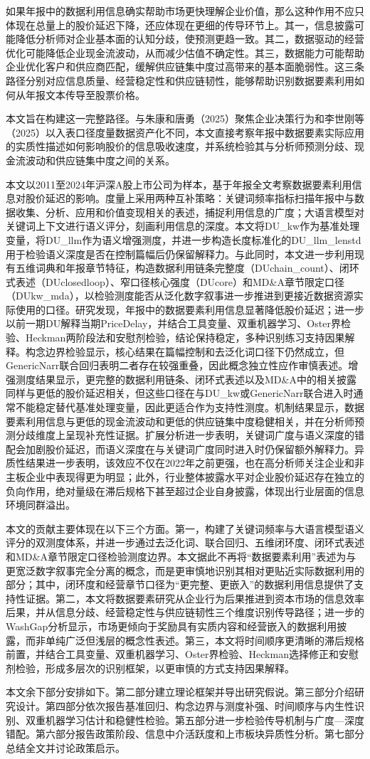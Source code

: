 如果年报中的数据利用信息确实帮助市场更快理解企业价值，那么这种作用不应只体现在总量上的股价延迟下降，还应体现在更细的传导环节上。其一，信息披露可能降低分析师对企业基本面的认知分歧，使预测更趋一致。其二，数据驱动的经营优化可能降低企业现金流波动，从而减少估值不确定性。其三，数据能力可能帮助企业优化客户和供应商匹配，缓解供应链集中度过高带来的基本面脆弱性。这三条路径分别对应信息质量、经营稳定性和供应链韧性，能够帮助识别数据要素利用如何从年报文本传导至股票价格。

本文旨在构建这一完整路径。与朱康和唐勇（2025）聚焦企业决策行为和李世刚等（2025）以入表口径度量数据资产化不同，本文直接考察年报中数据要素实际应用的实质性描述如何影响股价的信息吸收速度，并系统检验其与分析师预测分歧、现金流波动和供应链集中度之间的关系。

本文以2011至2024年沪深A股上市公司为样本，基于年报全文考察数据要素利用信息对股价延迟的影响。度量上采用两种互补策略：关键词频率指标扫描年报中与数据收集、分析、应用和价值变现相关的表述，捕捉利用信息的广度；大语言模型对关键词上下文进行语义评分，刻画利用信息的深度。本文将DU\_kw作为基准处理变量，将DU\_llm作为语义增强测度，并进一步构造长度标准化的DU\_llm\_lenstd用于检验语义深度是否在控制篇幅后仍保留解释力。与此同时，本文进一步利用现有五维词典和年报章节特征，构造数据利用链条完整度（DUchain\_count）、闭环式表述（DUclosedloop）、窄口径核心强度（DUcore）和MD\&A章节限定口径（DUkw\_mda），以检验测度能否从泛化数字叙事进一步推进到更接近数据资源实际使用的口径。研究发现，年报中的数据要素利用信息显著降低股价延迟；进一步以前一期DU解释当期PriceDelay，并结合工具变量、双重机器学习、Oster界检验、Heckman两阶段法和安慰剂检验，结论保持稳定，多种识别练习支持因果解释。构念边界检验显示，核心结果在篇幅控制和去泛化词口径下仍然成立，但GenericNarr联合回归表明二者存在较强重叠，因此概念独立性应作审慎表述。增强测度结果显示，更完整的数据利用链条、闭环式表述以及MD\&A中的相关披露同样与更低的股价延迟相关，但这些口径在与DU\_kw或GenericNarr联合进入时通常不能稳定替代基准处理变量，因此更适合作为支持性测度。机制结果显示，数据要素利用信息与更低的现金流波动和更低的供应链集中度稳健相关，并在分析师预测分歧维度上呈现补充性证据。扩展分析进一步表明，关键词广度与语义深度的错配会加剧股价延迟，而语义深度在与关键词广度同时进入时仍保留额外解释力。异质性结果进一步表明，该效应不仅在2022年之前更强，也在高分析师关注企业和非主板企业中表现得更为明显；此外，行业整体披露水平对企业股价延迟存在独立的负向作用，绝对量级在滞后规格下甚至超过企业自身披露，体现出行业层面的信息环境同群溢出。

本文的贡献主要体现在以下三个方面。第一，构建了关键词频率与大语言模型语义评分的双测度体系，并进一步通过去泛化词、联合回归、五维闭环度、闭环式表述和MD\&A章节限定口径检验测度边界。本文据此不再将``数据要素利用''表述为与更宽泛数字叙事完全分离的概念，而是更审慎地识别其相对更贴近实际数据利用的部分；其中，闭环度和经营章节口径为``更完整、更嵌入''的数据利用信息提供了支持性证据。第二，本文将数据要素研究从企业行为后果推进到资本市场的信息效率后果，并从信息分歧、经营稳定性与供应链韧性三个维度识别传导路径；进一步的WashGap分析显示，市场更倾向于奖励具有实质内容和经营嵌入的数据利用披露，而非单纯广泛但浅层的概念性表述。第三，本文将时间顺序更清晰的滞后规格前置，并结合工具变量、双重机器学习、Oster界检验、Heckman选择修正和安慰剂检验，形成多层次的识别框架，以更审慎的方式支持因果解释。

本文余下部分安排如下。第二部分建立理论框架并导出研究假说。第三部分介绍研究设计。第四部分依次报告基准回归、构念边界与测度补强、时间顺序与内生性识别、双重机器学习估计和稳健性检验。第五部分进一步检验传导机制与广度---深度错配。第六部分报告政策阶段、信息中介活跃度和上市板块异质性分析。第七部分总结全文并讨论政策启示。
